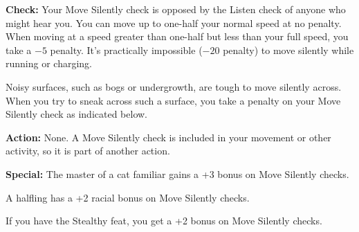 \textbf{Check:} Your Move Silently check is opposed by the Listen check of anyone who might hear you. You can move up to one-half your normal speed at no penalty. When moving at a speed greater than one-half but less than your full speed, you take a $-5$ penalty. It's practically impossible ($-20$ penalty) to move silently while running or charging.

Noisy surfaces, such as bogs or undergrowth, are tough to move silently across. When you try to sneak across such a surface, you take a penalty on your Move Silently check as indicated below.


\textbf{Action:} None. A Move Silently check is included in your movement or other activity, so it is part of another action.

\textbf{Special:} The master of a cat familiar gains a +3 bonus on Move Silently checks.

A halfling has a +2 racial bonus on Move Silently checks.

If you have the Stealthy feat, you get a +2 bonus on Move Silently checks.